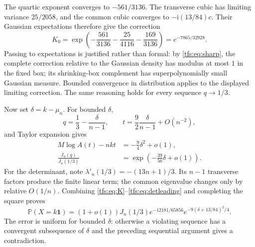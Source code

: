 \documentclass[11pt,a4paper]{article}
\numberwithin{equation}{section}
\theoremstyle{remark}
\newcommand{\Prob}{\mathbb P}
\newcommand{\1}{\mathbf 1}
\newcommand{\ii}{\mathrm i}
\begin{document}
The quartic exponent converges to $-561/3136$. The transverse cubic has
limiting variance $25/2058$, and the common cubic converges to
$-\ii(13/84)c$. Their Gaussian expectations therefore give the correction
\begin{equation}\label{tfs:eq:K}
K_0=\exp\left(-\frac{561}{3136}-\frac{25}{4116}
                              -\frac{169}{3136}\right)
    =e^{-7865/32928}.
\end{equation}
Passing to expectations is justified rather than formal: by
\eqref{tfs:eq:sharp}, the complete correction relative to the Gaussian density
has modulus at most $1$ in the fixed box; its shrinking-box complement
has superpolynomially small Gaussian measure. Bounded convergence in
distribution applies to the displayed limiting correction.
The same reasoning holds for every sequence $q\to1/3$.

Now set $\delta=k-\mu_n$. For bounded $\delta$,
\[
q=\frac13-\frac{\delta}{n-1},\qquad
 t=\frac92\frac{\delta}{n-1}+O(n^{-2}),
\]
and Taylor expansion gives
\begin{align}
M\log A(t)-nkt&=-\frac94\delta^2+o(1),\label{tfs:eq:rateleading}\\
\frac{J_n(q)}{J_n(1/3)}&=\exp\left(-\frac{39}{56}\delta+o(1)\right).
                                                       \label{tfs:eq:detleading}
\end{align}
For the determinant, note
$\lambda'_n(1/3)=-(13n+1)/3$. Its $n-1$ transverse factors produce the
finite linear term; the common eigenvalue changes only by relative
$O(1/n)$. Combining \eqref{tfs:eq:K}--\eqref{tfs:eq:detleading} and completing the
square proves
\begin{equation}\label{tfs:eq:fixedscore}
\Prob(X=k\1)=(1+o(1))J_n(1/3)e^{-12181/65856}
                e^{-9(\delta+13/84)^2/4}.
\end{equation}
The error is uniform for bounded $\delta$: otherwise a violating sequence
has a convergent subsequence of $\delta$ and the preceding sequential
argument gives a contradiction.
\end{document}
